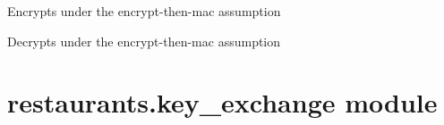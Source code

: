 \documentclass[letterpaper,10pt,english]{sphinxmanual}
\begin{document}

\begin{fulllineitems}
\label{restaurants:restaurants.crypto.encrypt}
Encrypts under the encrypt-then-mac assumption

\end{fulllineitems}


\begin{fulllineitems}
\label{restaurants:restaurants.crypto.decrypt}
Decrypts under the encrypt-then-mac assumption

\end{fulllineitems}



\section{restaurants.key\_exchange module}
\label{restaurants:module-restaurants.key_exchange}\label{restaurants:restaurants-key-exchange-module}
\end{document}
